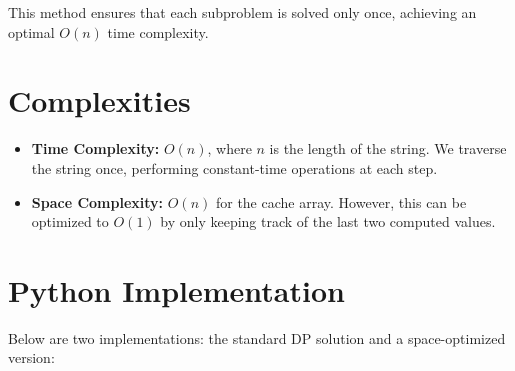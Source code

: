 This method ensures that each subproblem is solved only once, achieving an optimal \( O(n) \) time complexity.


\section*{Complexities}

\begin{itemize}
    \item \textbf{Time Complexity:} \( O(n) \), where \( n \) is the length of the string. We traverse the string once, performing constant-time operations at each step.
    \item \textbf{Space Complexity:} \( O(n) \) for the cache array. However, this can be optimized to \( O(1) \) by only keeping track of the last two computed values.
\end{itemize}

\newpage
\section*{Python Implementation}

Below are two implementations: the standard DP solution and a space-optimized version:


